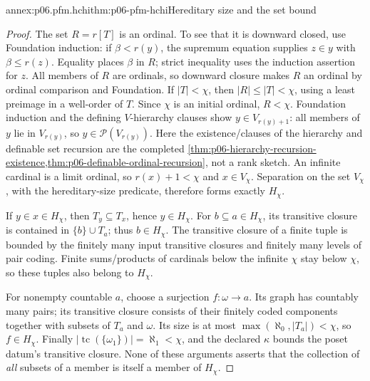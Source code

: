 \begin{annexitem}{annex:p06.pfm.hchi}{thm:p06-pfm-hchi}{Hereditary size and the set bound}
\begin{proof}
The set \(R=r[T]\) is an ordinal. To see that it is downward closed, use
Foundation induction: if \(\beta<r(y)\), the supremum equation supplies
\(z\in y\) with \(\beta\leq r(z)\). Equality places \(\beta\) in \(R\);
strict inequality uses the induction assertion for \(z\).
All members of \(R\) are ordinals, so downward closure makes \(R\) an
ordinal by ordinal comparison and Foundation.
If \(|T|<\chi\), then \(|R|\leq|T|<\chi\), using a least preimage in a
well-order of \(T\). Since \(\chi\) is an initial ordinal, \(R<\chi\).
Foundation induction and the defining \(V\)-hierarchy clauses show
\(y\in V_{r(y)+1}\): all members of \(y\) lie in \(V_{r(y)}\), so
\(y\in\mathcal P(V_{r(y)})\).
Here the existence/clauses of the hierarchy and definable set recursion are
the completed \cref{thm:p06-hierarchy-recursion-existence,thm:p06-definable-ordinal-recursion},
not a rank sketch. An infinite cardinal is a limit ordinal, so
\(r(x)+1<\chi\) and \(x\in V_\chi\).
Separation on the set \(V_\chi\), with the hereditary-size predicate,
therefore forms exactly \(H_\chi\).

If \(y\in x\in H_\chi\), then \(T_y\subseteq T_x\), hence \(y\in H_\chi\).
For \(b\subseteq a\in H_\chi\), its transitive closure is contained in
\(\{b\}\cup T_a\); thus \(b\in H_\chi\).
The transitive closure of a finite tuple is bounded by the finitely many
input transitive closures and finitely many levels of pair coding.
Finite sums/products of cardinals below the infinite \(\chi\) stay below
\(\chi\), so these tuples also belong to \(H_\chi\).

For nonempty countable \(a\), choose a surjection \(f:\omega\to a\).
Its graph has countably many pairs; its transitive closure consists of
their finitely coded components together with subsets of \(T_a\) and
\(\omega\). Its size is at most
\(\max(\aleph_0,|T_a|)<\chi\), so \(f\in H_\chi\).
Finally \(|\operatorname{tc}(\{\omega_1\})|=\aleph_1<\chi\), and the
declared \(\kappa\) bounds the poset datum's transitive closure.
None of these arguments asserts that the collection of \emph{all}
subsets of a member is itself a member of \(H_\chi\).
\end{proof}
\end{annexitem}

